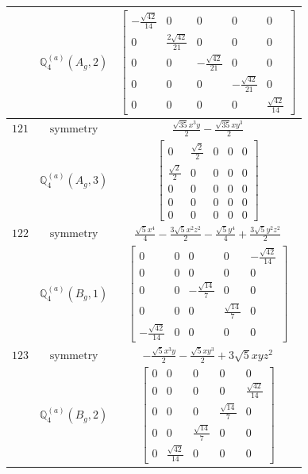 \documentclass[fleqn,8pt,landscape]{jsarticle}
\begin{document}
\begin{longtable}{ccc}
$  $ & $ \mathbb{Q}_{4}^{(a)}(A_{g},2) $ & $ \begin{bmatrix} - \frac{\sqrt{42}}{14} & 0 & 0 & 0 & 0 \\ 0 & \frac{2 \sqrt{42}}{21} & 0 & 0 & 0 \\ 0 & 0 & - \frac{\sqrt{42}}{21} & 0 & 0 \\ 0 & 0 & 0 & - \frac{\sqrt{42}}{21} & 0 \\ 0 & 0 & 0 & 0 & \frac{\sqrt{42}}{14} \end{bmatrix} $ \\ \hline
$ 121 $ & $ \text{symmetry} $ & $ \frac{\sqrt{35} x^{3} y}{2} - \frac{\sqrt{35} x y^{3}}{2} $ \\
$  $ & $ \mathbb{Q}_{4}^{(a)}(A_{g},3) $ & $ \begin{bmatrix} 0 & \frac{\sqrt{2}}{2} & 0 & 0 & 0 \\ \frac{\sqrt{2}}{2} & 0 & 0 & 0 & 0 \\ 0 & 0 & 0 & 0 & 0 \\ 0 & 0 & 0 & 0 & 0 \\ 0 & 0 & 0 & 0 & 0 \end{bmatrix} $ \\ \hline
$ 122 $ & $ \text{symmetry} $ & $ \frac{\sqrt{5} x^{4}}{4} - \frac{3 \sqrt{5} x^{2} z^{2}}{2} - \frac{\sqrt{5} y^{4}}{4} + \frac{3 \sqrt{5} y^{2} z^{2}}{2} $ \\
$  $ & $ \mathbb{Q}_{4}^{(a)}(B_{g},1) $ & $ \begin{bmatrix} 0 & 0 & 0 & 0 & - \frac{\sqrt{42}}{14} \\ 0 & 0 & 0 & 0 & 0 \\ 0 & 0 & - \frac{\sqrt{14}}{7} & 0 & 0 \\ 0 & 0 & 0 & \frac{\sqrt{14}}{7} & 0 \\ - \frac{\sqrt{42}}{14} & 0 & 0 & 0 & 0 \end{bmatrix} $ \\ \hline
$ 123 $ & $ \text{symmetry} $ & $ - \frac{\sqrt{5} x^{3} y}{2} - \frac{\sqrt{5} x y^{3}}{2} + 3 \sqrt{5} x y z^{2} $ \\
$  $ & $ \mathbb{Q}_{4}^{(a)}(B_{g},2) $ & $ \begin{bmatrix} 0 & 0 & 0 & 0 & 0 \\ 0 & 0 & 0 & 0 & \frac{\sqrt{42}}{14} \\ 0 & 0 & 0 & \frac{\sqrt{14}}{7} & 0 \\ 0 & 0 & \frac{\sqrt{14}}{7} & 0 & 0 \\ 0 & \frac{\sqrt{42}}{14} & 0 & 0 & 0 \end{bmatrix} $ \\ \hline

\end{longtable}
\end{document}
